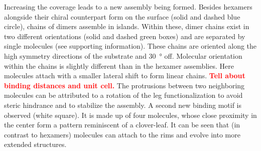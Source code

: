 %

Increasing the coverage leads to a new assembly being formed. Besides hexamers alongside their chiral counterpart form on the surface (solid and dashed blue circle), chains of dimers assemble in islands. Within these, dimer chains exist in two different orientations (solid and dashed green boxes) and are separated by single molecules (see supporting information). 
These chains are oriented along the high symmetry directions of the substrate and \SI{30}{\degree} off. Molecular orientation within the chains is slightly different than in the hexamer assemblies. Here molecules attach with a smaller lateral shift to form linear chains. 
\textbf{\textcolor{red}{Tell about binding distances and unit cell.}}
The protrusions between two neighboring molecules can be attributed to a rotation of the leg functionalization to avoid steric hindrance and to stabilize the assembly.
A second new binding motif is observed (white square).  It is made up of four molecules, whose close proximity in the center form a pattern reminiscent of a clover-leaf. It can be seen that (in contrast to hexamers) molecules can attach to the rims and evolve into more extended structures.

